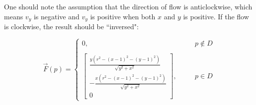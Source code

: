 \begin{exercise}{8}
\begin{enumerate}
    One should note the assumption that the direction of flow is anticlockwise, which means
    $v_y$ is negative and $v_y$ is positive when both $x$ and $y$ is positive. If the flow
    is clockwise, the result should be ``inversed":
    
    $$\vec{F}(p) =
      \left\{
      \begin{array}{lcr}
        0, & \quad & p \notin D \\ & & \\
        \begin{bmatrix}
          \frac{y(r^2 - (x-1)^2 - (y-1)^2)}{\sqrt{y^2 + x^2}} \\
          -\frac{x(r^2 - (x-1)^2 - (y-1)^2)}{\sqrt{y^2 + x^2}} \\
          0
        \end{bmatrix},
           & \quad & p \in D
      \end{array}
      \right.$$
    
  \end{enumerate}
\end{exercise}